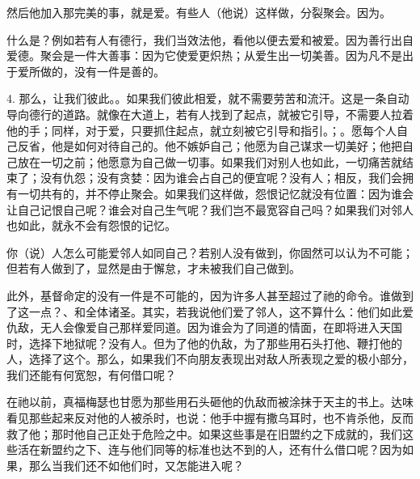 然后他加入那完美的事，就是爱。有些人（他说）这样做，分裂聚会。因为。\par

什么是？例如若有人有德行，我们当效法他，看他以便去爱和被爱。因为善行出自爱德。聚会是一件大善事：因为它使爱更炽热；从爱生出一切美善。因为凡不是出于爱所做的，没有一件是善的。\par

4. 那么，让我们彼此。。如果我们彼此相爱，就不需要劳苦和流汗。这是一条自动导向德行的道路。就像在大道上，若有人找到了起点，就被它引导，不需要人拉着他的手；同样，对于爱，只要抓住起点，就立刻被它引导和指引。；。愿每个人自己反省，他是如何对待自己的。他不嫉妒自己；他愿为自己谋求一切美好；他把自己放在一切之前；他愿意为自己做一切事。如果我们对别人也如此，一切痛苦就结束了；没有仇怨；没有贪婪：因为谁会占自己的便宜呢？没有人；相反，我们会拥有一切共有的，并不停止聚会。如果我们这样做，怨恨记忆就没有位置：因为谁会让自己记恨自己呢？谁会对自己生气呢？我们岂不最宽容自己吗？如果我们对邻人也如此，就永不会有怨恨的记忆。\par

你（说）人怎么可能爱邻人如同自己？若别人没有做到，你固然可以认为不可能；但若有人做到了，显然是由于懈怠，才未被我们自己做到。\par

此外，基督命定的没有一件是不可能的，因为许多人甚至超过了祂的命令。谁做到了这一点？、和全体诸圣。其实，若我说他们爱了邻人，这不算什么：他们如此爱仇敌，无人会像爱自己那样爱同道。因为谁会为了同道的情面，在即将进入天国时，选择下地狱呢？没有人。但为了他的仇敌，为了那些用石头打他、鞭打他的人，选择了这个。那么，如果我们不向朋友表现出对敌人所表现之爱的极小部分，我们还能有何宽恕，有何借口呢？\par

在祂以前，真福梅瑟也甘愿为那些用石头砸他的仇敌而被涂抹于天主的书上。达味看见那些起来反对他的人被杀时，也说：他手中握有撒乌耳时，也不肯杀他，反而救了他；那时他自己正处于危险之中。如果这些事是在旧盟约之下成就的，我们这些活在新盟约之下、连与他们同等的标准也达不到的人，还有什么借口呢？因为如果，那么当我们还不如他们时，又怎能进入呢？\par


